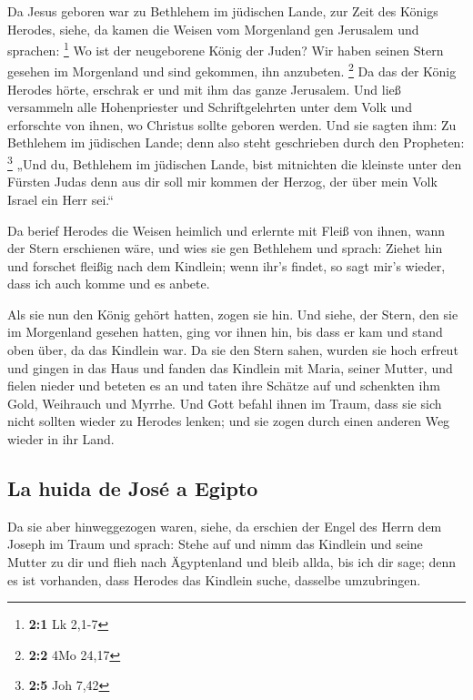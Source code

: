  Da Jesus geboren war zu Bethlehem im jüdischen Lande, zur
Zeit des Königs Herodes, siehe, da kamen die Weisen vom Morgenland gen
Jerusalem und sprachen: \footnote{\textbf{2:1} Lk 2,1-7} 
Wo ist der neugeborene König der Juden? Wir haben seinen Stern gesehen
im Morgenland und sind gekommen, ihn anzubeten. \footnote{\textbf{2:2}
  4Mo 24,17}  Da das der König Herodes hörte, erschrak er
und mit ihm das ganze Jerusalem.  Und ließ versammeln alle
Hohenpriester und Schriftgelehrten unter dem Volk und erforschte von
ihnen, wo Christus sollte geboren werden.  Und sie sagten
ihm: Zu Bethlehem im jüdischen Lande; denn also steht geschrieben durch
den Propheten: \footnote{\textbf{2:5} Joh 7,42}  „Und du,
Bethlehem im jüdischen Lande, bist mitnichten die kleinste unter den
Fürsten Judas denn aus dir soll mir kommen der Herzog, der über mein
Volk Israel ein Herr sei.``

 Da berief Herodes die Weisen heimlich und erlernte mit
Fleiß von ihnen, wann der Stern erschienen wäre,  und wies
sie gen Bethlehem und sprach: Ziehet hin und forschet fleißig nach dem
Kindlein; wenn ihr's findet, so sagt mir's wieder, dass ich auch komme
und es anbete.

 Als sie nun den König gehört hatten, zogen sie hin. Und
siehe, der Stern, den sie im Morgenland gesehen hatten, ging vor ihnen
hin, bis dass er kam und stand oben über, da das Kindlein war.
 Da sie den Stern sahen, wurden sie hoch erfreut
 und gingen in das Haus und fanden das Kindlein mit
Maria, seiner Mutter, und fielen nieder und beteten es an und taten ihre
Schätze auf und schenkten ihm Gold, Weihrauch und Myrrhe.
 Und Gott befahl ihnen im Traum, dass sie sich nicht
sollten wieder zu Herodes lenken; und sie zogen durch einen anderen Weg
wieder in ihr Land.

\hypertarget{la-huida-de-josuxe9-a-egipto}{%
\subsection{La huida de José a
Egipto}\label{la-huida-de-josuxe9-a-egipto}}

 Da sie aber hinweggezogen waren, siehe, da erschien der
Engel des Herrn dem Joseph im Traum und sprach: Stehe auf und nimm das
Kindlein und seine Mutter zu dir und flieh nach Ägyptenland und bleib
allda, bis ich dir sage; denn es ist vorhanden, dass Herodes das
Kindlein suche, dasselbe umzubringen.

